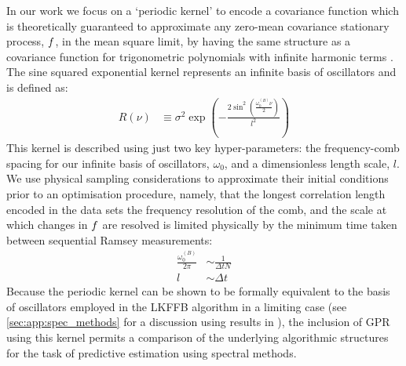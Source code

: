 In our work we focus on a `periodic kernel' to encode a covariance function which is theoretically guaranteed to approximate any zero-mean covariance stationary process, $f$, in the mean square limit, by having the same structure as a covariance function for trigonometric polynomials with infinite harmonic terms \cite{solin2014explicit, karlin1975first}. The sine squared exponential kernel represents an infinite basis of oscillators and is defined as:
\begin{align}
R(\nu) &\equiv \sigma^2 \exp (- \frac{2\sin^2(\frac{\omega_0^{(B)}\nu}{2})}{l^2}) 
\end{align} 
This kernel is described using just two key hyper-parameters: the frequency-comb spacing for our infinite basis of oscillators, $\omega_0$, and a dimensionless length scale, $l$. We use physical sampling considerations to approximate their initial conditions prior to an optimisation procedure, namely, that the longest correlation length encoded in the data sets the frequency resolution of the comb, and the scale at which changes in $f$ are resolved is limited physically by the minimum time taken between sequential Ramsey measurements:
\begin{align}
\frac{\omega_0^{(B)}}{2\pi} & \sim  \frac{1}{\Delta t N} \\
l & \sim \Delta t
\end{align} 
Because the periodic kernel can be shown to be formally equivalent to the basis of oscillators employed in the LKFFB algorithm in a limiting case (see \cref{sec:app:spec_methods} for a discussion using results in \cite{solin2014explicit}), the inclusion of GPR using this kernel permits a comparison of the underlying algorithmic structures for the task of predictive estimation using spectral methods. %

